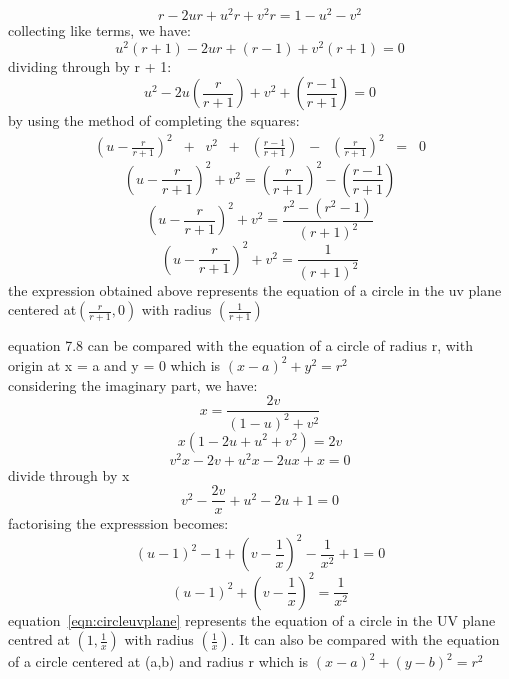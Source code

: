 \begin{equation*}
r - 2ur + u^2r + v^2r = 1 - u^2 - v^2
\end{equation*}
collecting like terms, we have:
\begin{equation*}
u^2(r + 1) -2ur + (r - 1) + v^2(r + 1) = 0
\end{equation*}
dividing through by r + 1:
\begin{equation}
u^2 - 2u(\frac{r}{r + 1}) + v^2 +(\frac{r - 1}{r + 1}) = 0
\end{equation}
by using the method of completing the squares:
\begin{align*}
(u - \frac{r}{r+1})^2\;\;+\;\;v^2\;\;+\;\;(\frac{r-1}{r+1})\;\; - \;\;(\frac{r}{r+1})^2\;\; = \;\;0
\end{align*}
\begin{equation*}
(u - \frac{r}{r + 1})^2 + v^2 =(\frac{r}{r + 1})^2 -(\frac{r - 1}{r + 1}) 
\end{equation*}
\begin{equation*}
(u - \frac{r}{r + 1})^2+ v^2 =\frac{r^2 -(r^2 -1)}{(r + 1)^2}
\end{equation*}
\begin{equation}
(u - \frac{r}{r + 1})^2+ v^2 = \frac{1}{(r + 1)^2}
\end{equation}
the expression obtained above represents the equation of a circle in the uv plane centered at$ (\frac{r}{r + 1}, 0) $ with radius $ (\frac{1}{r + 1}) $

equation 7.8 can be compared  with  the equation of a circle of radius r, with origin at x = a and y = 0 which is $ (x - a)^2 + y^2 = r^2 $\\ 
considering the imaginary part, we have:
\begin{equation*}
x =\frac{2v}{(1 - u)^2 + v^2}
\end{equation*}
\begin{equation*}
x(1 - 2u + u^2 + v^2) = 2v
\end{equation*}
\begin{equation*}
v^2x - 2v + u^2x - 2ux + x = 0
\end{equation*}
divide through by x
\begin{equation*}
v^2 - \frac{2v}{x} +u^2 - 2u + 1 = 0
\end{equation*}
factorising the expresssion becomes:
\begin{equation*}
(u - 1)^2 -1 + (v - \frac{1}{x})^2 -\frac{1}{x^2} + 1 = 0
\end{equation*}
\begin{equation}
(u - 1)^2 + (v - \frac{1}{x})^2 = \frac{1}{x^2}
\end{equation}
equation~\eqref{eqn:circleuvplane} represents the equation of a circle in the UV plane centred at $ (1,\frac{1}{x}) $ with radius $ (\frac{1}{x}) $.
It can also be compared with the equation of a circle centered at (a,b) and radius r which is $ (x - a)^2 + (y-b)^2 = r^2 $

